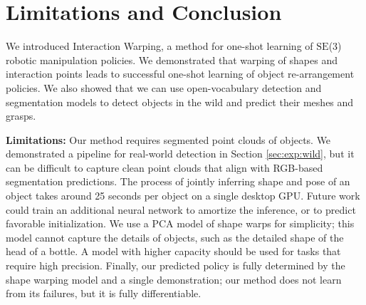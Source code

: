 \documentclass{article}
\begin{document}
\section{Limitations and Conclusion}

We introduced Interaction Warping, a method for one-shot learning of $\mathrm{SE}$(3) robotic manipulation policies. We demonstrated that warping of shapes and interaction points leads to successful one-shot learning of object re-arrangement policies. We also showed that we can use open-vocabulary detection and segmentation models to detect objects in the wild and predict their meshes and grasps. 

\textbf{Limitations:} Our method requires segmented point clouds of objects. We demonstrated a pipeline for real-world detection in Section \ref{sec:exp:wild}, but it can be difficult to capture clean point clouds that align with RGB-based segmentation predictions. The process of jointly inferring shape and pose of an object takes around 25 seconds per object on a single desktop GPU. Future work could train an additional neural network to amortize the inference, or to predict favorable initialization. We use a PCA model of shape warps for simplicity; this model cannot capture the details of objects, such as the detailed shape of the head of a bottle. A model with higher capacity should be used for tasks that require high precision. Finally, our predicted policy is fully determined by the shape warping model and a single demonstration; our method does not learn from its failures, but it is fully differentiable.



\clearpage


\end{document}

